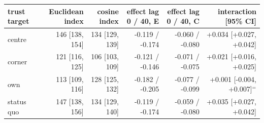 \begin{tabular}{lrrrrr}
\toprule
trust target & Euclidean index & cosine index & effect lag 0 / 40, E & effect lag 0 / 40, C & interaction [95\% CI] \\
\midrule
centre & 146 [138, 154] & 134 [129, 139] & -0.119 / -0.174 & -0.060 / -0.080 & +0.034 [+0.027, +0.042] \\
corner & 121 [116, 125] & 106 [103, 109] & -0.121 / -0.146 & -0.071 / -0.075 & +0.021 [+0.016, +0.025] \\
own & 113 [109, 116] & 128 [125, 132] & -0.182 / -0.205 & -0.077 / -0.099 & +0.001 [-0.004, +0.007]$^{=}$ \\
status quo & 147 [138, 156] & 134 [129, 140] & -0.119 / -0.174 & -0.059 / -0.080 & +0.035 [+0.027, +0.042] \\
\bottomrule
\end{tabular}
